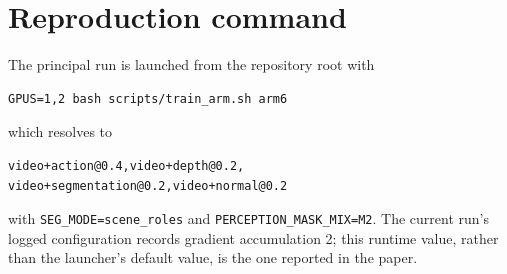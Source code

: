 \documentclass{article}
\newcommand{\code}[1]{\texttt{#1}}
\begin{document}
\section{Reproduction command}

The principal run is launched from the repository root with
\begin{verbatim}
GPUS=1,2 bash scripts/train_arm.sh arm6
\end{verbatim}
which resolves to
\begin{verbatim}
video+action@0.4,video+depth@0.2,
video+segmentation@0.2,video+normal@0.2
\end{verbatim}
with \code{SEG\_MODE=scene\_roles} and \code{PERCEPTION\_MASK\_MIX=M2}. The current run's logged
configuration records gradient accumulation 2; this runtime value, rather than the launcher's
default value, is the one reported in the paper.
\end{document}
